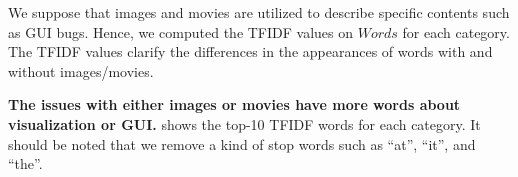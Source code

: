 We suppose that images and movies are utilized to 
describe specific contents such as GUI bugs. 
Hence, we computed the TFIDF values 
on $Words$ for each category. 
The TFIDF values clarify the differences in the appearances of 
words with and without images/movies. 

\textbf{The issues with either images or movies have 
more words about visualization or GUI.}
 shows the top-10 TFIDF words
for each category.
It should be noted that we remove a kind of stop words such as 
``at'', ``it'', and ``the''. 
